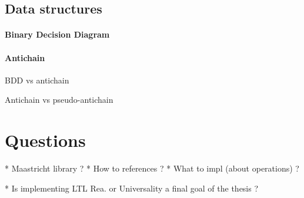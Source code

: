 \documentclass[letterpaper]{article}
\begin{document}
\subsection{Data structures}

\paragraph{Binary Decision Diagram}

\paragraph{Antichain}

BDD vs antichain

Antichain vs pseudo-antichain

\section{Questions}

* Maastricht library ?
* How to references ?
* What to impl (about operations) ?

* Is implementing LTL Rea. or Universality a final goal of the thesis ?



\end{document}
